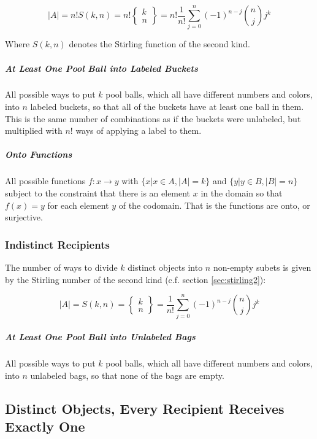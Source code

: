 \begin{equation}
|A| = n!S(k,n) =n! \left\{ \begin{array}{c} k \\n \end{array}\right\} = n! \frac{1}{n!}\sum_{j=0}^n (-1)^{n-j} {n \choose j }j^k\end{equation}

Where $S(k,n)$	 denotes the Stirling function of the second kind.


\subparagraph{At Least One Pool Ball into Labeled Buckets} All possible ways to put $k$ pool balls, which all have different numbers and colors, into $n$ labeled buckets, so that all of the buckets have at least one ball in them. This is the same number of combinations as if the buckets were unlabeled, but multiplied with $n!$ ways of applying a label to them.

\subparagraph{Onto Functions} All possible functions $f:x \rightarrow y$ with $\{x | x\in A, |A| = k \}$ and $\{y | y\in B, |B| = n\}$ subject to the constraint that there is an element $x$ in the domain so that $f(x)=y$ for each element $y$ of the codomain. That is the functions are onto, or surjective.


\subsubsection{Indistinct Recipients}
The number of ways to divide $k$ distinct objects into $n$ non-empty subets is given by the Stirling number of the second kind (c.f. section \ref{sec:stirling2}):

\begin{equation}
|A| = S(k,n) = \left\{ \begin{array}{c} k \\n \end{array} \right\} = \frac{1}{n!}\sum_{j=0}^n (-1)^{n-j} {n \choose j }j^k	\end{equation}



\subparagraph{At Least One Pool Ball into Unlabeled Bags} All possible ways to put $k$ pool balls, which all have different numbers and colors, into $n$ unlabeled bags, so that none of the bags are empty. 


\subsection{Distinct Objects, Every Recipient Receives Exactly One}

